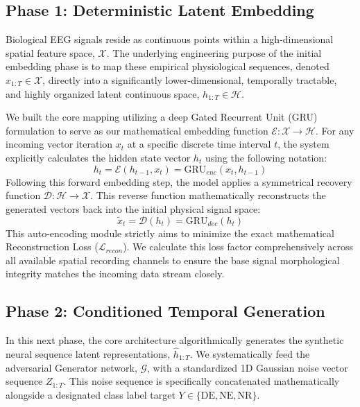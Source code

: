 \documentclass[journal,10pt,twocolumn]{IEEEtran}
\begin{document}
\subsection{Phase 1: Deterministic Latent Embedding}
Biological EEG signals reside as continuous points within a high-dimensional spatial feature space, $\mathcal{X}$. The underlying engineering purpose of the initial embedding phase is to map these empirical physiological sequences, denoted $x_{1:T} \in \mathcal{X}$, directly into a significantly lower-dimensional, temporally tractable, and highly organized latent continuous space, $h_{1:T} \in \mathcal{H}$. 

We built the core mapping utilizing a deep Gated Recurrent Unit (GRU) formulation to serve as our mathematical embedding function $\mathcal{E}:\mathcal{X} \rightarrow \mathcal{H}$. For any incoming vector iteration $x_{t}$ at a specific discrete time interval $t$, the system explicitly calculates the hidden state vector $h_{t}$ using the following notation:
\begin{equation}
    h_t = \mathcal{E}(h_{t-1}, x_t) = \text{GRU}_{enc}(x_t, h_{t-1})
\end{equation}
Following this forward embedding step, the model applies a symmetrical recovery function $\mathcal{D}:\mathcal{H} \rightarrow \mathcal{X}$. This reverse function mathematically reconstructs the generated vectors back into the initial physical signal space:
\begin{equation}
    \tilde{x}_t = \mathcal{D}(h_t) = \text{GRU}_{dec}(h_t)
\end{equation}
This auto-encoding module strictly aims to minimize the exact mathematical Reconstruction Loss ($\mathcal{L}_{recon}$). We calculate this loss factor comprehensively across all available spatial recording channels to ensure the base signal morphological integrity matches the incoming data stream closely.

\subsection{Phase 2: Conditioned Temporal Generation}
In this next phase, the core architecture algorithmically generates the synthetic neural sequence latent representations, $\hat{h}_{1:T}$. We systematically feed the adversarial Generator network, $\mathcal{G}$, with a standardized 1D Gaussian noise vector sequence $Z_{1:T}$. This noise sequence is specifically concatenated mathematically alongside a designated class label target $Y \in \{\text{DE}, \text{NE}, \text{NR}\}$.
\end{document}

